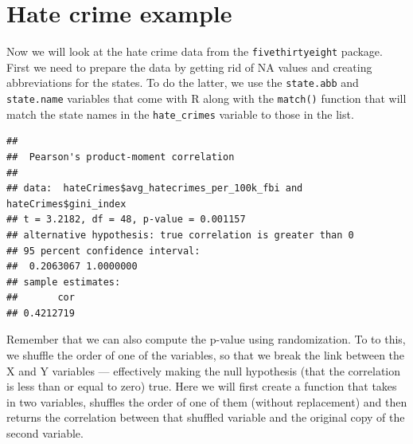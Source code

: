 \documentclass[12pt,]{book}
\newenvironment{Shaded}{\begin{snugshade}}{\end{snugshade}}
\newcommand{\CommentTok}[1]{\textcolor[rgb]{0.56,0.35,0.01}{\textit{#1}}}
\newcommand{\DataTypeTok}[1]{\textcolor[rgb]{0.13,0.29,0.53}{#1}}
\newcommand{\KeywordTok}[1]{\textcolor[rgb]{0.13,0.29,0.53}{\textbf{#1}}}
\newcommand{\NormalTok}[1]{#1}
\newcommand{\OperatorTok}[1]{\textcolor[rgb]{0.81,0.36,0.00}{\textbf{#1}}}
\newcommand{\StringTok}[1]{\textcolor[rgb]{0.31,0.60,0.02}{#1}}
\begin{document}
\hypertarget{hate-crime-example}{%
\section{Hate crime example}\label{hate-crime-example}}

Now we will look at the hate crime data from the \texttt{fivethirtyeight} package. First we need to prepare the data by getting rid of NA values and creating abbreviations for the states. To do the latter, we use the \texttt{state.abb} and \texttt{state.name} variables that come with R along with the \texttt{match()} function that will match the state names in the \texttt{hate\_crimes} variable to those in the list.

\begin{Shaded}
\end{Shaded}

\begin{verbatim}
## 
##  Pearson's product-moment correlation
## 
## data:  hateCrimes$avg_hatecrimes_per_100k_fbi and hateCrimes$gini_index
## t = 3.2182, df = 48, p-value = 0.001157
## alternative hypothesis: true correlation is greater than 0
## 95 percent confidence interval:
##  0.2063067 1.0000000
## sample estimates:
##       cor 
## 0.4212719
\end{verbatim}

Remember that we can also compute the p-value using randomization. To to this, we shuffle the order of one of the variables, so that we break the link between the X and Y variables --- effectively making the null hypothesis (that the correlation is less than or equal to zero) true. Here we will first create a function that takes in two variables, shuffles the order of one of them (without replacement) and then returns the correlation between that shuffled variable and the original copy of the second variable.
\end{document}
